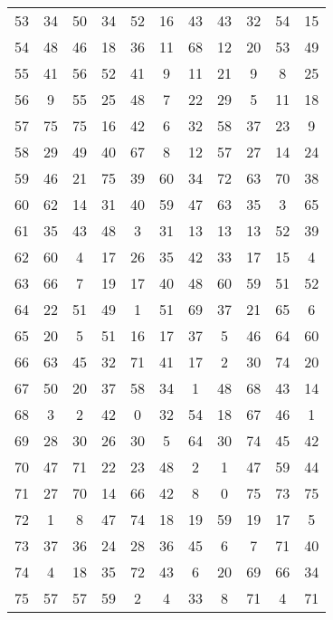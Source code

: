 \begin{table}
\begin{tabular}{c c c c c c c c c c c }
53 & 34 & 50 & 34 & 52 & 16 & 43 & 43 & 32 & 54 & 15 \\
54 & 48 & 46 & 18 & 36 & 11 & 68 & 12 & 20 & 53 & 49 \\
55 & 41 & 56 & 52 & 41 & 9 & 11 & 21 & 9 & 8 & 25 \\
56 & 9 & 55 & 25 & 48 & 7 & 22 & 29 & 5 & 11 & 18 \\
57 & 75 & 75 & 16 & 42 & 6 & 32 & 58 & 37 & 23 & 9 \\
58 & 29 & 49 & 40 & 67 & 8 & 12 & 57 & 27 & 14 & 24 \\
59 & 46 & 21 & 75 & 39 & 60 & 34 & 72 & 63 & 70 & 38 \\
60 & 62 & 14 & 31 & 40 & 59 & 47 & 63 & 35 & 3 & 65 \\
61 & 35 & 43 & 48 & 3 & 31 & 13 & 13 & 13 & 52 & 39 \\
62 & 60 & 4 & 17 & 26 & 35 & 42 & 33 & 17 & 15 & 4 \\
63 & 66 & 7 & 19 & 17 & 40 & 48 & 60 & 59 & 51 & 52 \\
64 & 22 & 51 & 49 & 1 & 51 & 69 & 37 & 21 & 65 & 6 \\
65 & 20 & 5 & 51 & 16 & 17 & 37 & 5 & 46 & 64 & 60 \\
66 & 63 & 45 & 32 & 71 & 41 & 17 & 2 & 30 & 74 & 20 \\
67 & 50 & 20 & 37 & 58 & 34 & 1 & 48 & 68 & 43 & 14 \\
68 & 3 & 2 & 42 & 0 & 32 & 54 & 18 & 67 & 46 & 1 \\
69 & 28 & 30 & 26 & 30 & 5 & 64 & 30 & 74 & 45 & 42 \\
70 & 47 & 71 & 22 & 23 & 48 & 2 & 1 & 47 & 59 & 44 \\
71 & 27 & 70 & 14 & 66 & 42 & 8 & 0 & 75 & 73 & 75 \\
72 & 1 & 8 & 47 & 74 & 18 & 19 & 59 & 19 & 17 & 5 \\
73 & 37 & 36 & 24 & 28 & 36 & 45 & 6 & 7 & 71 & 40 \\
74 & 4 & 18 & 35 & 72 & 43 & 6 & 20 & 69 & 66 & 34 \\
75 & 57 & 57 & 59 & 2 & 4 & 33 & 8 & 71 & 4 & 71 \\
\hline
\end{tabular}
\end{table}